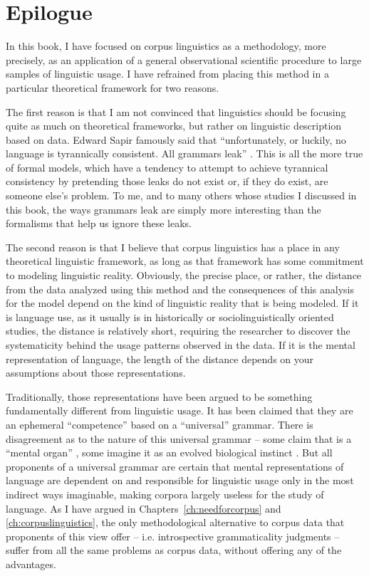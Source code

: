\chapter{Epilogue}\largerpage

In this book, I have focused on corpus linguistics as a methodology, more precisely, as an application of a general observational  scientific procedure to large  samples of linguistic usage. I have refrained from placing this method in a particular theoretical framework for two reasons.

The first reason is that I am not convinced that linguistics should be focusing quite as much on theoretical frameworks, but rather on linguistic description  based on data. Edward Sapir famously said that ``unfortunately, or luckily, no language is tyrannically consistent. All grammars leak'' \citep[39]{sapir_language:_1921}. This is all the more true of formal models, which have a tendency to attempt to achieve tyrannical consistency by pretending those leaks do not exist or, if they do exist, are someone else's problem. To me, and to many others whose studies I discussed in this book, the ways grammars leak are simply more interesting than the formalisms that help us ignore these leaks.

The second reason is that I believe that corpus linguistics has a place in any theoretical linguistic framework, as long as that framework has some commitment to modeling linguistic reality. Obviously, the precise place, or rather, the distance from the data analyzed using this method and the consequences of this analysis for the model depend on the kind of linguistic reality that is being modeled. If it is language use, as it usually is in historically or sociolinguistically  oriented studies, the distance is relatively short, requiring the researcher to discover the systematicity behind the usage patterns observed in the data. If it is the mental representation of language, the length of the distance depends on your assumptions about those representations.

Traditionally, those representations have been argued to be something fundamentally different from linguistic usage. It has been claimed that they are an ephemeral ``competence''  based on a ``universal'' grammar.  There is disagreement as to the nature of this universal grammar -- some claim that is a ``mental organ'' \citep{chomsky_rules_1980}, some imagine it as an evolved biological instinct \citep{pinker_language_1994}. But all proponents of a universal grammar are certain that mental representations of language are dependent on and responsible for linguistic usage only in the most indirect ways imaginable, making corpora largely useless for the study of language. As I have argued in Chapters~\ref{ch:needforcorpus} and \ref{ch:corpuslinguistics}, the only methodological alternative to corpus data that proponents of this view offer -- i.e. introspective  grammaticality  judgments -- suffer from all the same problems as corpus data, without offering any of the advantages.

